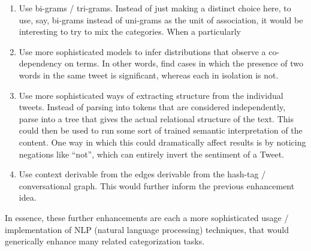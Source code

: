 \documentclass[12pt,a4paper]{article}
\begin{document}
\begin{enumerate}[1)]
\item Use bi-grams / tri-grams.  Instead of just making a distinct choice here, to use, say, bi-grams instead of uni-grams as the unit of association, it would be interesting to try to mix the categories.  When a particularly 

\item Use more sophisticated models to infer distributions that observe a co-dependency on terms.  In other words, find cases in which the presence of two words in the same tweet is significant, whereas each in isolation is not.

\item Use more sophisticated ways of extracting structure from the individual tweets.  Instead of parsing into tokens that are considered independently, parse into a tree that gives the actual relational structure of the text.  This could then be used to run some sort of trained semantic interpretation of the content.  One way in which this could dramatically affect results is by noticing negations like ``not'', which can entirely invert the sentiment of a Tweet.

\item Use context derivable from the edges derivable from the hash-tag / conversational graph.  This would further inform the previous enhancement idea.
\end{enumerate}

In essence, these further enhancements are each a more sophisticated usage / implementation of NLP (natural language processing) techniques, that would generically enhance many related categorization tasks.
\end{document}
